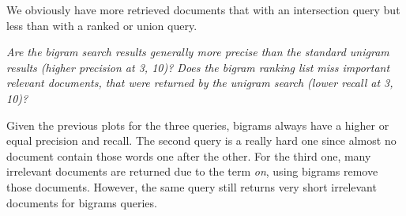 We obviously have more retrieved documents that with an intersection query but less than with a ranked or union query.

\textit{Are the bigram search results generally more precise than the standard unigram results (higher precision at 3, 10)? Does the bigram ranking list miss important relevant documents, that were returned by the unigram search (lower recall at 3, 10)?}

Given the previous plots for the three queries, bigrams always have a higher or equal precision and recall. The second query is a really hard one since almost no document contain those words one after the other. For the third one, many irrelevant documents are returned due to the term \textit{on}, using bigrams remove those documents. However, the same query still returns very short irrelevant documents for bigrams queries.

